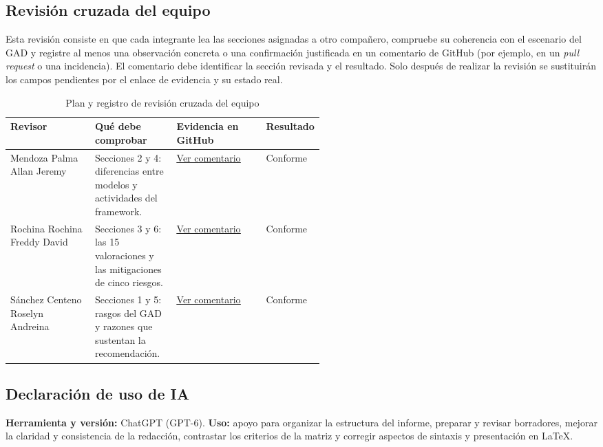 \documentclass[conference,onecolumn]{IEEEtran}
\begin{document}
\subsection{Revisión cruzada del equipo}

Esta revisión consiste en que cada integrante lea las secciones asignadas a otro compañero, compruebe su coherencia con el escenario del GAD y registre al menos una observación concreta o una confirmación justificada en un comentario de GitHub (por ejemplo, en un \emph{pull request} o una incidencia). El comentario debe identificar la sección revisada y el resultado. Solo después de realizar la revisión se sustituirán los campos pendientes por el enlace de evidencia y su estado real.

\begin{table}[H]
\caption{Plan y registro de revisión cruzada del equipo}
\label{tab:revision}
\centering
\footnotesize
\renewcommand{\arraystretch}{1.23}
\begin{tabularx}{\linewidth}{@{}p{0.27\linewidth}p{0.26\linewidth}YY@{}}
\toprule
\textbf{Revisor} & \textbf{Qué debe comprobar} & \textbf{Evidencia en GitHub} & \textbf{Resultado}\\
\midrule
Mendoza Palma Allan Jeremy & Secciones 2 y 4: diferencias entre modelos y actividades del framework. & \href{ https://github.com/AllanMendoza09/IR-trabajos-grupales-MRS/issues/1#issuecomment-6726163458 }{\underline{Ver comentario}}  & Conforme\\
Rochina Rochina Freddy David & Secciones 3 y 6: las 15 valoraciones y las mitigaciones de cinco riesgos. & \href{ https://github.com/AllanMendoza09/IR-trabajos-grupales-MRS/issues/1#issuecomment-6727304369}{\underline{Ver comentario}} & Conforme\\
Sánchez Centeno Roselyn Andreina & Secciones 1 y 5: rasgos del GAD y razones que sustentan la recomendación. & \href{ https://github.com/AllanMendoza09/IR-trabajos-grupales-MRS/issues/1#issuecomment-6728221181}{\underline{Ver comentario}} & Conforme\\
\bottomrule
\end{tabularx}
\end{table}

\subsection{Declaración de uso de IA}

\noindent\textbf{Herramienta y versión:} ChatGPT (GPT-6). \textbf{Uso:} apoyo para organizar la estructura del informe, preparar y revisar borradores, mejorar la claridad y consistencia de la redacción, contrastar los criterios de la matriz y corregir aspectos de sintaxis y presentación en \LaTeX{}. 
\end{document}
